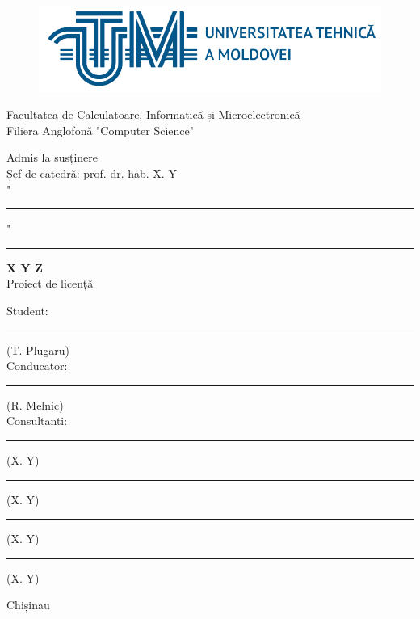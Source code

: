 \begin{titlepage}

\newcommand{\HRule}{\rule{\linewidth}{0.5mm}}

\center

\begin{figure}[!h]
	\centering
	\includegraphics[scale=.3]{abstract/figures/utm-logo-long.png}
\end{figure}

Facultatea de Calculatoare, Informatică și Microelectronică\\
Filiera Anglofonă "Computer Science"\\


\vspace{2cm}

\hfill Admis la susținere\\
\hfill Șef de catedră: prof. dr. hab. X. Y\\

\vspace{0.4cm}
\hfill "\rule{0.75cm}{0.2mm}" \ \rule{3cm}{0.2mm} \the\year
\vspace{3cm}


\begin{center}
\Large \textbf{X Y Z}\\
\vspace{0.6cm}
Proiect de licență
\end{center}
\vspace{1cm}


\hfill Student: \rule{3.9cm}{0.2mm}(T. Plugaru)\\
\vspace{0.2cm}
\hfill Conducator: \rule{4cm}{0.2mm}(R. Melnic)\\
\vspace{0.2cm}
\hfill Consultanti: \rule{4.2cm}{0.2mm}(X. Y)\\
\vspace{0.2cm}
\hfill \rule{4cm}{0.2mm}(X. Y)\\
\vspace{0.2cm}
\hfill \rule{3.9cm}{0.2mm}(X. Y)\\
\vspace{0.2cm}
\hfill \rule{4cm}{0.2mm}(X. Y)\\
\vspace{4cm}


\begin{center}
Chișinau \the\year
\end{center}

\vfill

\end{titlepage}
